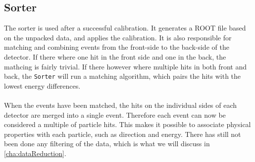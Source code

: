 \subsection{Sorter}
The sorter is used after a successful calibration. It generates a ROOT file based on the unpacked data, and applies the calibration. 
It is also responsible for matching and combining events from the front-side to the back-side of the detector. If there where one hit in the front side and one in the back, the mathcing is fairly trivial. If there however where multiple hits in both front and back, the \texttt{Sorter} will run a matching algorithm, which pairs the hits with the lowest energy differences. \\
\\
When the events have been matched, the hits on the individual sides of each detector are merged into a single event. 
Therefore each event can now be considered a multiple of particle hits. This makes it possible to associate physical properties with each particle, such as direction and energy. 
There has still not been done any filtering of the data, which is what we will discuss in  \cref{cha:dataReduction}.


